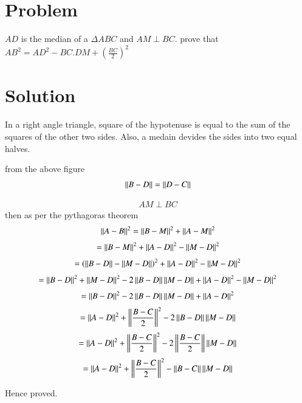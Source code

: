 \documentclass[journal,12pt,twocolumn]{IEEEtran}
\begin{document}
\section{Problem}
$ AD $ is the median of a $\Delta ABC $ and $ AM \perp BC $. prove that \\
$ AB^2 = AD^2 - BC.DM + (\frac{BC}{2})^2 $
\section{Solution}
In a right angle triangle, square of the hypotenuse is equal to the sum of the squares of the other two sides. Also, a medain devides the sides into two  equal halves.\\ 



	\begin{center}
	\end{center}
from the above figure\\
\begin{align}
\left\lVert B-D\right\rVert = \left\lVert D-C\right\rVert
\end{align}

\begin{align}
AM \perp BC
\end{align}
then as per the pythagoras theorem\\
\begin{align}
\left\lVert A-B\right\rVert^2 = \left\lVert B-M\right\rVert^2 + \left\lVert A-M\right\rVert^2
\end{align}
\begin{align}
 = \left\lVert B-M\right\rVert^2 + \left\lVert A-D\right\rVert^2 - \left\lVert M-D\right\rVert^2
\end{align}
\begin{align}
=\left(\left\lVert B-D\right\rVert-\left\lVert M-D\right\rVert\right)^2 + \left\lVert A-D\right\rVert^2 - \left\lVert M-D\right\rVert^2
\end{align}
\begin{align}
=\left\lVert B-D\right\rVert^2 + \left\lVert M-D\right\rVert^2 - 2\left\lVert B-D\right\rVert\left\lVert M-D\right\rVert+\left\lVert A-D\right\rVert^2 - \left\lVert M-D\right\rVert^2
\end{align}
\begin{align}
=\left\lVert B-D\right\rVert^2 - 2\left\lVert B-D\right\rVert\left\lVert M-D\right\rVert+\left\lVert A-D\right\rVert^2
\end{align}
\begin{align}
=\left\lVert A-D\right\rVert^2 + \left\lVert\frac{B-C}{2}\right\rVert^2 - 2 \left\lVert B-D\right\rVert\left\lVert M-D\right\rVert
\end{align}
\begin{align}
=\left\lVert A-D\right\rVert^2 + \left\lVert\frac{B-C}{2}\right\rVert^2 - 2 \left\lVert\frac{B-C}{2}\right\rVert\left\lVert M-D\right\rVert
\end{align}
\begin{align}
=\left\lVert A-D\right\rVert^2 + \left\lVert\frac{B-C}{2}\right\rVert^2 - \left\lVert B-C\right\rVert\left\lVert M-D\right\rVert
\end{align}

\hspace{2cm}     Hence proved.
\end{document}

